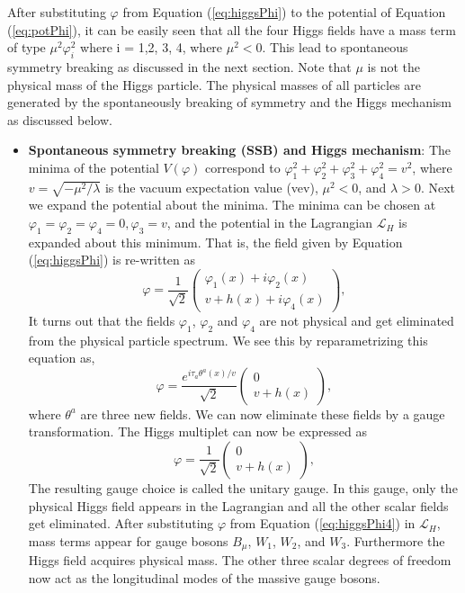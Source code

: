 After substituting $\varphi$ from Equation (\ref{eq:higgsPhi}) to the potential of
Equation (\ref{eq:potPhi}), it can be easily seen that all the four Higgs fields 
have a mass term of type $\mu^2\varphi_i^2$ where i = 1,2, 3, 4, where $\mu^2 < 0$. This
lead to spontaneous symmetry breaking as discussed in the next section.
Note that $\mu$ is not the physical mass of the Higgs particle. 
The physical masses of 
all particles are generated by the spontaneously breaking of symmetry 
\cite{PhysRev.127.965} and the Higgs mechanism 
\cite{PhysRevLett.13.321,HIGGS1964132,Isildak:2013kfa,PhysRevLett.13.508,PhysRevLett.13.585,PhysRev.145.1156,PhysRev.155.1554} as discussed below. 
\begin{itemize}[leftmargin=*]
\item \textbf{Spontaneous symmetry breaking (SSB) and Higgs mechanism}: 
The minima of the potential 
$V(\varphi)$ correspond to $\varphi_1^2 + \varphi_2^2 + 
\varphi_3^2 + \varphi_4^2 = v^2$, where $v = \sqrt{-\mu^2/\lambda}$ 
is the vacuum expectation value (vev), $\mu^2 < 0$, and $\lambda > 
0$. Next we  
 expand the potential about the minima.  
The minima can be chosen at 
$\varphi_1 = \varphi_2 = \varphi_4 = 0, \varphi_3 = v$, and the
potential in the Lagrangian $\mathcal{L}_H$ is expanded about this
minimum. That is, the field given by Equation (\ref{eq:higgsPhi})
is re-written as 
\begin{equation}
\varphi = \frac{1}{\sqrt 2} \left(\begin{array}{c} \varphi_1(x)+i\varphi_2(x)
\\ v + h(x) + i\varphi_4(x) \end{array}\right),
\label{eq:higgsPhi2}
\end{equation}
It turns out that the fields $\varphi_1$, $\varphi_2$ and $\varphi_4$ are
not physical and get eliminated from the physical particle spectrum. We 
see this by reparametrizing this equation as,
\begin{equation}
\varphi = \frac{e^{i\tau_a\theta^a(x)/v}}{\sqrt{2}}
\left(\begin{array}{c} 0
\\ v+h(x) \end{array}\right),
\label{eq:higgsPhi3}
\end{equation}
where $\theta^a$ are three new fields. We can now eliminate these fields 
by a gauge transformation. The Higgs multiplet can now be expressed as
\begin{equation}
\varphi = \frac{1}{\sqrt{2}}
\left(\begin{array}{c} 0
\\ v+h(x) \end{array}\right),
\label{eq:higgsPhi4}
\end{equation}
The resulting gauge choice is called the unitary gauge. In this gauge, only the physical Higgs field appears in the Lagrangian and
all the other scalar fields get eliminated. After substituting $\varphi$ from 
Equation (\ref{eq:higgsPhi4}) in $\mathcal{L}_H$, mass terms appear for gauge 
bosons $B_\mu$, $W_1$, $W_2$, and $W_3$. Furthermore the Higgs
field acquires physical mass. The other three scalar degrees of freedom now
act as the longitudinal modes of the massive gauge bosons. 


\end{itemize}
